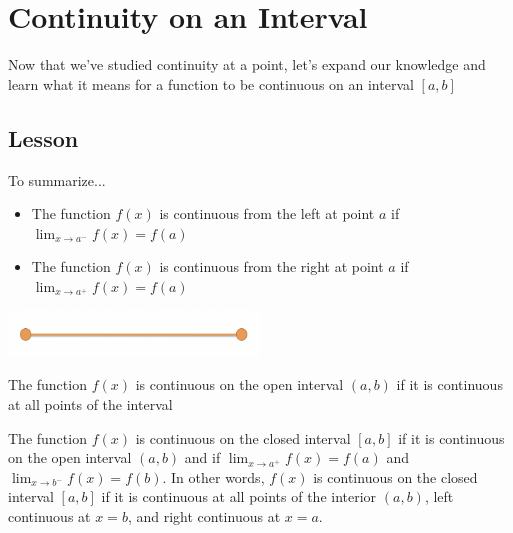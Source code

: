 \documentclass{ximera}
\begin{document}
\section{Continuity on an Interval}

Now that we've studied continuity at a point, let's expand our knowledge and learn what it means for a function to be continuous on an interval $[a,b]$

\subsection{Lesson}
\begin{center}
\end{center}

To summarize...

\begin{explanation}
    \begin{foldable}
        \begin{itemize}
            \item The function $f(x)$ is continuous from the left at point $a$ if $\lim_{x \to a^-} f(x) = f(a)$
            \item The function $f(x)$ is continuous from the right at point $a$ if $\lim_{x \to a^+} f(x) = f(a)$
        \end{itemize}
        \begin{center}  
	\begin{image}          
        \includegraphics[width=0.5\textwidth]{graph4.png}
        	\end{image}
	\end{center}
    \end{foldable}

    \begin{foldable}
        The function $f(x)$ is continuous on the open interval $(a,b)$ if it is continuous at all points of the interval
    \end{foldable}

    \begin{foldable}
        The function $f(x)$ is continuous on the closed interval $[a,b]$ if it is continuous on the open interval $(a,b)$ and if $\lim_{x \to a^+} f(x) = f(a)$ and $\lim_{x \to b^-} f(x) = f(b)$.
        In other words, $f(x)$ is continuous on the closed interval $[a,b]$ if it is continuous at all points of the interior $(a,b)$, left continuous at $x=b$, and right continuous at $x=a$.
    \end{foldable}{}
\end{explanation}
\end{document}

